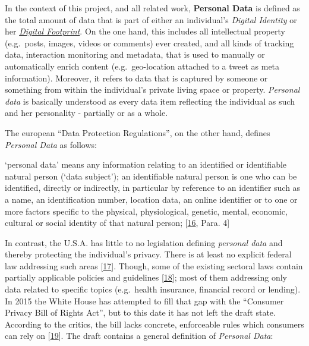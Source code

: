 \documentclass[12pt,english,a4paper,titlepage,cleardoublepage=empty,dottedtoc]{report}
\let\origquote\quote
\let\endorigquote\endquote
\renewenvironment{quote}{%
    \origquote
    \itshape
}
{\endorigquote}
\begin{document}
In the context of this project, and all related work,
\textbf{\protect\hypertarget{def--personal-data}{}{Personal Data}} is
defined as the total amount of data that is part of either an
individual's \emph{Digital Identity} or her
\emph{\protect\hyperlink{terminologies--digital-footprint}{Digital
Footprint}}. On the one hand, this includes all intellectual property
(e.g.~posts, images, videos or comments) ever created, and all kinds of
tracking data, interaction monitoring and metadata, that is used to
manually or automatically enrich content (e.g.~geo-location attached to
a tweet as meta information). Moreover, it refers to data that is
captured by someone or something from within the individual's private
living space or property. \emph{Personal data} is basically understood
as every data item reflecting the individual as such and her personality
- partially or as a whole.

The european ``Data Protection Regulations'', on the other hand, defines
\emph{\protect\hypertarget{def--personal-data-as-of-legis}{}{Personal
Data}} as follows:

\begin{quote}
`personal data' means any information relating to an identified or
identifiable natural person (`data subject'); an identifiable natural
person is one who can be identified, directly or indirectly, in
particular by reference to an identifier such as a name, an
identification number, location data, an online identifier or to one or
more factors specific to the physical, physiological, genetic, mental,
economic, cultural or social identity of that natural person;
{[}\protect\hyperlink{ref-regulation_2016_eu_general-data-protection-regulation_definition}{16},
Para. 4{]}
\end{quote}

In contrast, the U.S.A. has little to no legislation defining
\emph{personal data} and thereby protecting the individual's privacy.
There is at least no explicit federal law addressing such areas
{[}\protect\hyperlink{ref-web_2016_wikipedia_information-privacy-law_us}{17}{]}.
Though, some of the existing sectoral laws contain partially applicable
policies and guidelines
{[}\protect\hyperlink{ref-web_2016_data-protection-laws-in-the-us}{18}{]};
most of them addressing only data related to specific topics
(e.g.~health insurance, financial record or lending). In 2015 the White
House has attempted to fill that gap with the ``Consumer Privacy Bill of
Rights Act'', but to this date it has not left the draft state.
According to the critics, the bill lacks concrete, enforceable rules
which consumers can rely on
{[}\protect\hyperlink{ref-web_2015_white-house-releases-consumer-privacy-bill-draft}{19}{]}.
The draft contains a general definition of \emph{Personal Data}:
\end{document}
